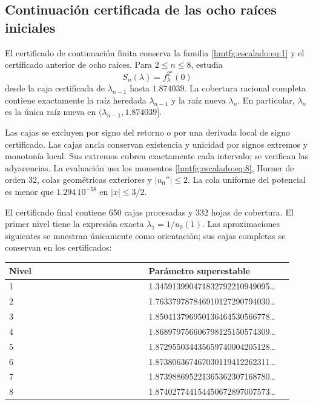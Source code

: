 \subsection{Continuación certificada de las ocho raíces iniciales}
\label{hmtfg:escalado:9}

El certificado de continuación finita conserva la familia \eqref{hmtfg:escalado:eq:1} y el certificado anterior de ocho raíces. Para \(2\le n\le8\), estudia
\[
S_n(\lambda)=f_\lambda^{2^n}(0)
\]
desde la caja certificada de \(\lambda_{n-1}\) hasta \(1.874039\). La cobertura racional completa contiene exactamente la raíz heredada \(\lambda_{n-1}\) y la raíz nueva \(\lambda_n\). En particular, \(\lambda_n\) es la única raíz nueva en \((\lambda_{n-1},1.874039]\).

Las cajas se excluyen por signo del retorno o por una derivada local de signo certificado. Las cajas ancla conservan existencia y unicidad por signos extremos y monotonía local. Sus extremos cubren exactamente cada intervalo; se verifican las adyacencias. La evaluación usa los momentos \eqref{hmtfg:escalado:eq:8}, Horner de orden 32, colas geométricas exteriores y \(|u_0''|\le2\). La cola uniforme del potencial es menor que \(1.294\,10^{-58}\) en \(|x|\le3/2\).

El certificado final contiene 650 cajas procesadas y 332 hojas de cobertura. El primer nivel tiene la expresión exacta \(\lambda_1=1/u_0(1)\). Las aproximaciones siguientes se muestran únicamente como orientación; sus cajas completas se conservan en los certificados:

\begingroup\small
\begin{longtable}{p{0.465\linewidth}p{0.465\linewidth}}
\hline
Nivel & Parámetro superestable \\
\hline
1 & 1.345913990471832792210949095… \\
2 & 1.763379787846910127290794030… \\
3 & 1.850413796950136464530566778… \\
4 & 1.868979756606798125150574309… \\
5 & 1.872955034435659740004205128… \\
6 & 1.873806367467030119412262311… \\
7 & 1.873988695221365362307168780… \\
8 & 1.874027744154450672897007573… \\
\hline\end{longtable}
\endgroup
